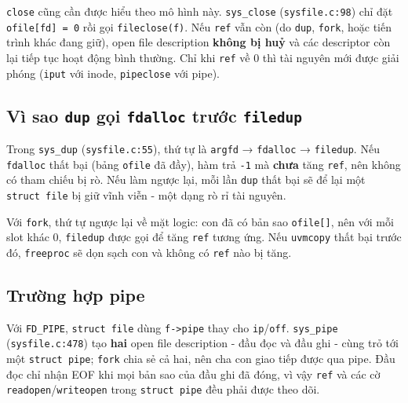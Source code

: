 \texttt{close} cũng cần được hiểu theo mô hình này. \texttt{sys\_close} (\texttt{sysfile.c:98}) chỉ đặt \texttt{ofile[fd] = 0} rồi gọi \texttt{fileclose(f)}. Nếu \texttt{ref} vẫn còn (do \texttt{dup}, \texttt{fork}, hoặc tiến trình khác đang giữ), open file description \textbf{không bị huỷ} và các descriptor còn lại tiếp tục hoạt động bình thường. Chỉ khi \texttt{ref} về 0 thì tài nguyên mới được giải phóng (\texttt{iput} với inode, \texttt{pipeclose} với pipe).

\subsection{Vì sao \texttt{dup} gọi \texttt{fdalloc} trước \texttt{filedup}}

Trong \texttt{sys\_dup} (\texttt{sysfile.c:55}), thứ tự là \texttt{argfd} → \texttt{fdalloc} → \texttt{filedup}. Nếu \texttt{fdalloc} thất bại (bảng \texttt{ofile} đã đầy), hàm trả \texttt{-1} mà \textbf{chưa} tăng \texttt{ref}, nên không có tham chiếu bị rò. Nếu làm ngược lại, mỗi lần \texttt{dup} thất bại sẽ để lại một \texttt{struct file} bị giữ vĩnh viễn - một dạng rò rỉ tài nguyên.

Với \texttt{fork}, thứ tự ngược lại về mặt logic: con đã có bản sao \texttt{ofile[]}, nên với mỗi slot khác 0, \texttt{filedup} được gọi để tăng \texttt{ref} tương ứng. Nếu \texttt{uvmcopy} thất bại trước đó, \texttt{freeproc} sẽ dọn sạch con và không có \texttt{ref} nào bị tăng.

\subsection{Trường hợp pipe}

Với \texttt{FD\_PIPE}, \texttt{struct file} dùng \texttt{f->pipe} thay cho \texttt{ip}/\texttt{off}. \texttt{sys\_pipe} (\texttt{sysfile.c:478}) tạo \textbf{hai} open file description - đầu đọc và đầu ghi - cùng trỏ tới một \texttt{struct pipe}; \texttt{fork} chia sẻ cả hai, nên cha con giao tiếp được qua pipe. Đầu đọc chỉ nhận EOF khi mọi bản sao của đầu ghi đã đóng, vì vậy \texttt{ref} và các cờ \texttt{readopen}/\texttt{writeopen} trong \texttt{struct pipe} đều phải được theo dõi.
